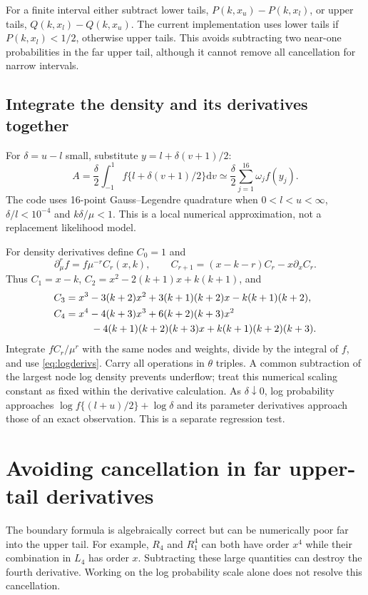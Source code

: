 \documentclass[11pt,a4paper]{article}
\newcommand{\dd}{\mathrm{d}}
\begin{document}
For a finite interval either subtract lower tails,
$P(k,x_u)-P(k,x_l)$, or upper tails, $Q(k,x_l)-Q(k,x_u)$.
The current implementation uses lower tails if $P(k,x_l)<1/2$, otherwise
upper tails. This avoids subtracting two near-one probabilities in the far
upper tail, although it cannot remove all cancellation for narrow intervals.

\subsection{Integrate the density and its derivatives together}
For $\delta=u-l$ small, substitute $y=l+\delta(v+1)/2$:
\begin{equation}
 A=\frac{\delta}{2}\int_{-1}^{1}f\{l+\delta(v+1)/2\}\dd v
   \simeq\frac{\delta}{2}\sum_{j=1}^{16}\omega_j f(y_j).
 \label{eq:quad}
\end{equation}
The code uses 16-point Gauss--Legendre quadrature when
$0<l<u<\infty$, $\delta/l<10^{-4}$ and $k\delta/\mu<1$.
This is a local numerical approximation, not a replacement likelihood model.

For density derivatives define $C_0=1$ and
\[
 \partial_\mu^rf=f\mu^{-r}C_r(x,k),\qquad
 C_{r+1}=(x-k-r)C_r-x\partial_x C_r.
\]
Thus $C_1=x-k$, $C_2=x^2-2(k+1)x+k(k+1)$, and
\begin{align*}
 C_3&=x^3-3(k+2)x^2+3(k+1)(k+2)x-k(k+1)(k+2),\\
 C_4&=x^4-4(k+3)x^3+6(k+2)(k+3)x^2\\
    &\hspace{9mm}-4(k+1)(k+2)(k+3)x+k(k+1)(k+2)(k+3).
\end{align*}
Integrate $f C_r/\mu^r$ with the same nodes and weights, divide by the
integral of $f$, and use \eqref{eq:logderivs}. Carry all operations in
$\theta$ triples. A common subtraction of the largest node log density
prevents underflow; treat this numerical scaling constant as fixed within
the derivative calculation. As $\delta\downarrow0$, log probability approaches
$\log f\{(l+u)/2\}+\log\delta$ and its parameter derivatives approach those
of an exact observation. This is a separate regression test.

\newpage
\section{Avoiding cancellation in far upper-tail derivatives}
The boundary formula is algebraically correct but can be numerically poor
far into the upper tail. For example, $R_4$ and $R_1^4$ can both have order
$x^4$ while their combination in $L_4$ has order $x$. Subtracting these
large quantities can destroy the fourth derivative. Working on the log
probability scale alone does not resolve this cancellation.
\end{document}

